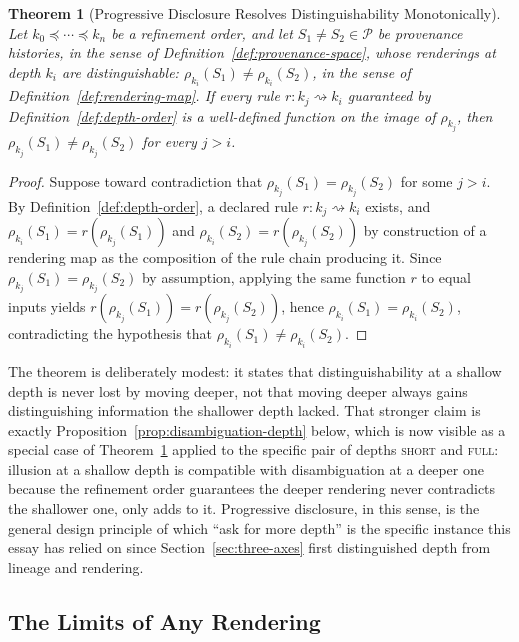 \documentclass[11pt]{article}
\newtheorem{theorem}{Theorem}[section]
\theoremstyle{definition}
\begin{document}
\begin{theorem}[Progressive Disclosure Resolves Distinguishability Monotonically]
\label{thm:progressive-disclosure}
Let $k_0 \preceq \cdots \preceq k_n$ be a refinement order, and let $S_1 \neq S_2 \in \mathcal{P}$ be provenance histories, in the sense of Definition~\ref{def:provenance-space}, whose renderings at depth $k_i$ are distinguishable: $\rho_{k_i}(S_1) \neq \rho_{k_i}(S_2)$, in the sense of Definition~\ref{def:rendering-map}. If every rule $r : k_j \rightsquigarrow k_i$ guaranteed by Definition~\ref{def:depth-order} is a well-defined function on the image of $\rho_{k_j}$, then $\rho_{k_j}(S_1) \neq \rho_{k_j}(S_2)$ for every $j > i$.
\end{theorem}

\begin{proof}
Suppose toward contradiction that $\rho_{k_j}(S_1) = \rho_{k_j}(S_2)$ for some $j > i$. By Definition~\ref{def:depth-order}, a declared rule $r : k_j \rightsquigarrow k_i$ exists, and $\rho_{k_i}(S_1) = r(\rho_{k_j}(S_1))$ and $\rho_{k_i}(S_2) = r(\rho_{k_j}(S_2))$ by construction of a rendering map as the composition of the rule chain producing it. Since $\rho_{k_j}(S_1) = \rho_{k_j}(S_2)$ by assumption, applying the same function $r$ to equal inputs yields $r(\rho_{k_j}(S_1)) = r(\rho_{k_j}(S_2))$, hence $\rho_{k_i}(S_1) = \rho_{k_i}(S_2)$, contradicting the hypothesis that $\rho_{k_i}(S_1) \neq \rho_{k_i}(S_2)$.
\end{proof}

The theorem is deliberately modest: it states that distinguishability at a shallow depth is never lost by moving deeper, not that moving deeper always gains distinguishing information the shallower depth lacked. That stronger claim is exactly Proposition~\ref{prop:disambiguation-depth} below, which is now visible as a special case of Theorem~\ref{thm:progressive-disclosure} applied to the specific pair of depths \textsc{short} and \textsc{full}: illusion at a shallow depth is compatible with disambiguation at a deeper one because the refinement order guarantees the deeper rendering never contradicts the shallower one, only adds to it. Progressive disclosure, in this sense, is the general design principle of which ``ask for more depth'' is the specific instance this essay has relied on since Section~\ref{sec:three-axes} first distinguished depth from lineage and rendering.

\subsection{The Limits of Any Rendering}
\end{document}
